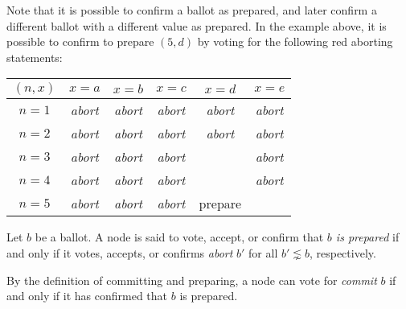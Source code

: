 \begin{exmp}
    Note that it is possible to confirm a ballot as prepared, and later confirm a different ballot with a different value as prepared.
    In the example above, it is possible to confirm to prepare $(5, d)$ by voting for the following red aborting statements:
    \begin{center}
        \begin{tabular}{|c|c|c|c|c|c|}
            \hline
            $(n, x)$ & $x = a$                           & $x = b$                           & $x = c$                          & $x = d$                           & $x = e$                           \\ \hline
            $n = 1$  & \cellcolor{blue!25}\textit{abort} & \cellcolor{blue!25}\textit{abort} & \cellcolor{red!25}\textit{abort} & \cellcolor{blue!25}\textit{abort} & \cellcolor{blue!25}\textit{abort} \\ \hline
            $n = 2$  & \cellcolor{blue!25}\textit{abort} & \cellcolor{blue!25}\textit{abort} & \cellcolor{red!25}\textit{abort} & \cellcolor{blue!25}\textit{abort} & \cellcolor{blue!25}\textit{abort} \\ \hline
            $n = 3$  & \cellcolor{blue!25}\textit{abort} & \cellcolor{blue!25}\textit{abort} & \cellcolor{red!25}\textit{abort} &                                   & \cellcolor{red!25}\textit{abort}  \\ \hline
            $n = 4$  & \cellcolor{red!25}\textit{abort}  & \cellcolor{red!25}\textit{abort}  & \cellcolor{red!25}\textit{abort} &                                   & \cellcolor{red!25}\textit{abort}  \\ \hline
            $n = 5$  & \cellcolor{red!25}\textit{abort}  & \cellcolor{red!25}\textit{abort}  & \cellcolor{red!25}\textit{abort} & prepare                           &                                   \\ \hline
        \end{tabular}
    \end{center}
\end{exmp}

\begin{defn}[Prepare]\label{def_prepare}
    Let $b$ be a ballot.
    A node is said to vote, accept, or confirm that \textit{$b$ is prepared} if and only if it votes, accepts, or confirms \textit{abort} $b'$ for all $b' \lnsim b$, respectively.
\end{defn}

\begin{rem}
    By the definition of committing and preparing, a node can vote for \textit{commit} $b$ if and only if it has confirmed that $b$ is prepared.
\end{rem}

